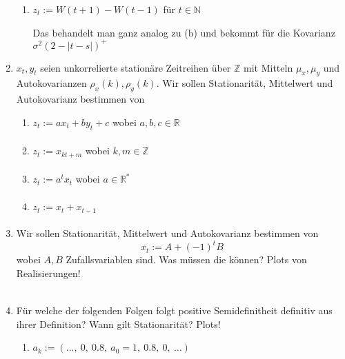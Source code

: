 \documentclass[a4paper,11pt,notitlepage,fullpage]{article}
\begin{document}
\begin{enumerate}
\begin{enumerate}
\item $z_t := W(t+1)-W(t-1)$ für $t\in \mathbb{N}$

Das behandelt man ganz analog zu (b) und bekommt für die Kovarianz $\sigma^2 \left(2-|t-s| \right)^+$
\end{enumerate}


\item $x_t, y_t$ seien unkorrelierte stationäre Zeitreihen über $\mathbb{Z}$ mit Mitteln $\mu_x, \mu_y$ und Autokovarianzen $\rho_x(k), \rho_y(k)$. Wir sollen Stationarität, Mittelwert und Autokovarianz bestimmen von
\begin{enumerate}
\item $z_t := ax_t + by_t + c$ wobei $a,b,c \in \mathbb{R}$
\begin{align*}
\end{align*}

\item $z_t := x_{kt+m}$ wobei $k,m \in \mathbb{Z}$
\begin{align*}
\end{align*}

\item $z_t := a^tx_t$ wobei $a \in \mathbb{R}^*$
\begin{align*}
\end{align*}

\item $z_t := x_t + x_{t-1}$
\begin{align*}
\end{align*}
\end{enumerate}

\item Wir sollen Stationarität, Mittelwert und Autokovarianz bestimmen von
$$x_t := A + (-1)^t B$$
wobei $A, B$ Zufallsvariablen sind. Was müssen die können? Plots von Realisierungen!

\begin{align*}
\end{align*}


\item Für welche der folgenden Folgen folgt positive Semidefinitheit definitiv aus ihrer Definition? Wann gilt Stationarität? Plots!
\begin{enumerate}
\item $a_k := (\ldots, ~0, ~0.8, ~a_0=1, ~0.8, ~0, ~\ldots)$
\begin{align*}
\end{align*}


\end{enumerate}
\end{enumerate}
\end{document}
